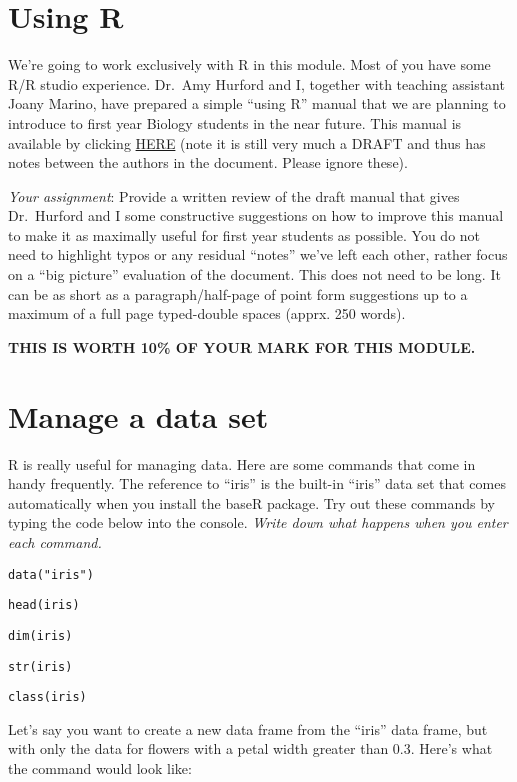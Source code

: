 \documentclass[]{book}
\begin{document}
\chapter{Using R}\label{using-r}

We're going to work exclusively with R in this module. Most of you have
some R/R studio experience. Dr.~Amy Hurford and I, together with
teaching assistant Joany Marino, have prepared a simple ``using R''
manual that we are planning to introduce to first year Biology students
in the near future. This manual is available by clicking
\href{https://ahurford.github.io/quantitative-training-guide/}{HERE}
(note it is still very much a DRAFT and thus has notes between the
authors in the document. Please ignore these).

\emph{Your assignment}: Provide a written review of the draft manual
that gives Dr.~Hurford and I some constructive suggestions on how to
improve this manual to make it as maximally useful for first year
students as possible. You do not need to highlight typos or any residual
``notes'' we've left each other, rather focus on a ``big picture''
evaluation of the document. This does not need to be long. It can be as
short as a paragraph/half-page of point form suggestions up to a maximum
of a full page typed-double spaces (apprx. 250 words).

\textbf{THIS IS WORTH 10\% OF YOUR MARK FOR THIS MODULE.}

\chapter{Manage a data set}\label{manage-a-data-set}

R is really useful for managing data. Here are some commands that come
in handy frequently. The reference to ``iris'' is the built-in ``iris''
data set that comes automatically when you install the baseR package.
Try out these commands by typing the code below into the console.
\emph{Write down what happens when you enter each command.}

\texttt{data("iris")}

\texttt{head(iris)}

\texttt{dim(iris)}

\texttt{str(iris)}

\texttt{class(iris)}

Let's say you want to create a new data frame from the ``iris'' data
frame, but with only the data for flowers with a petal width greater
than 0.3. Here's what the command would look like:
\end{document}
